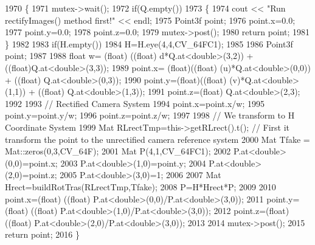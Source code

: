 \begin{DoxyCode}
1970 \{
1971     mutex->wait();
1972     \textcolor{keywordflow}{if}(Q.empty())
1973     \{
1974         cout << \textcolor{stringliteral}{"Run rectifyImages() method first!"} << endl;
1975         Point3f point;
1976         point.x=0.0;
1977         point.y=0.0;
1978         point.z=0.0;
1979         mutex->post();
1980         \textcolor{keywordflow}{return} point;
1981     \}
1982 
1983     \textcolor{keywordflow}{if}(H.empty())
1984         H=H.eye(4,4,CV\_64FC1);
1985 
1986     Point3f point;
1987 
1988     \textcolor{keywordtype}{float} w= (float) ((\textcolor{keywordtype}{float}) d*Q.at<\textcolor{keywordtype}{double}>(3,2)) + ((float)Q.at<\textcolor{keywordtype}{double}>(3,3));
1989     point.x= (float)((\textcolor{keywordtype}{float}) (u)*Q.at<\textcolor{keywordtype}{double}>(0,0)) + ((\textcolor{keywordtype}{float}) Q.at<\textcolor{keywordtype}{double}>(0,3));
1990     point.y=(float)((\textcolor{keywordtype}{float}) (v)*Q.at<\textcolor{keywordtype}{double}>(1,1)) + ((\textcolor{keywordtype}{float}) Q.at<\textcolor{keywordtype}{double}>(1,3));
1991     point.z=(float) Q.at<\textcolor{keywordtype}{double}>(2,3);
1992 
1993     \textcolor{comment}{// Rectified Camera System}
1994     point.x=point.x/w;
1995     point.y=point.y/w;
1996     point.z=point.z/w;
1997 
1998     \textcolor{comment}{// We transform to H Coordinate System}
1999     Mat RLrectTmp=this->getRLrect().t(); \textcolor{comment}{// First it transform the point to the unrectified camera
       reference system}
2000     Mat Tfake = Mat::zeros(0,3,CV\_64F);
2001     Mat P(4,1,CV\_64FC1);
2002     P.at<\textcolor{keywordtype}{double}>(0,0)=point.x;
2003     P.at<\textcolor{keywordtype}{double}>(1,0)=point.y;
2004     P.at<\textcolor{keywordtype}{double}>(2,0)=point.z;
2005     P.at<\textcolor{keywordtype}{double}>(3,0)=1;
2006 
2007     Mat Hrect=buildRotTras(RLrectTmp,Tfake);
2008     P=H*Hrect*P;
2009 
2010     point.x=(float) ((\textcolor{keywordtype}{float}) P.at<\textcolor{keywordtype}{double}>(0,0)/P.at<\textcolor{keywordtype}{double}>(3,0));
2011     point.y=(float) ((\textcolor{keywordtype}{float}) P.at<\textcolor{keywordtype}{double}>(1,0)/P.at<\textcolor{keywordtype}{double}>(3,0));
2012     point.z=(float) ((\textcolor{keywordtype}{float}) P.at<\textcolor{keywordtype}{double}>(2,0)/P.at<\textcolor{keywordtype}{double}>(3,0));
2013 
2014     mutex->post();
2015     \textcolor{keywordflow}{return} point;
2016 \}
\end{DoxyCode}
